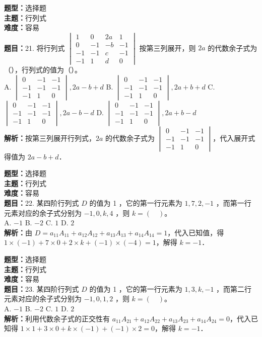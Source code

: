 \documentclass{ctexart}
\newenvironment{question}[5]{%
	\noindent\textbf{题型：}#1\\
	\textbf{主题：}#2\\
	\textbf{难度：}#3\\
	\textbf{题目：}#4\\
	\textbf{解析：}#5\\
	\vspace{1em}
}{}
\begin{document}
	\begin{question}
		{选择题}
		{行列式}
		{容易}
		{21. 将行列式 $\begin{vmatrix}1 & 0 & 2a & 1 \\ 0 & -1 & -b & -1 \\ -1 & -1 & c & -1 \\ -1 & 1 & d & 0\end{vmatrix}$ 按第三列展开，则 $2a$ 的代数余子式为（），行列式的值为（）。\\
			A. $\begin{vmatrix}0 & -1 & -1 \\ -1 & -1 & -1 \\ -1 & 1 & 0\end{vmatrix}, 2a-b+d$ \quad
			B. $\begin{vmatrix}0 & -1 & -1 \\ -1 & -1 & -1 \\ -1 & 1 & 0\end{vmatrix}, 2a+b+d$ \quad
			C. $\begin{vmatrix}0 & -1 & -1 \\ -1 & -1 & -1 \\ -1 & 1 & 0\end{vmatrix}, 2a-b-d$ \quad
			D. $\begin{vmatrix}0 & -1 & -1 \\ -1 & -1 & -1 \\ -1 & 1 & 0\end{vmatrix}, 2a+b-d$}
		{按第三列展开行列式，$2a$ 的代数余子式为 $\begin{vmatrix}0 & -1 & -1 \\ -1 & -1 & -1 \\ -1 & 1 & 0\end{vmatrix}$，代入展开式得值为 $2a-b+d$．}
	\end{question}
	
	
	\begin{question}
		{选择题}
		{行列式}
		{容易}
		{22. 某四阶行列式 $D$ 的值为 1 ，它的第一行元素为 $1,7,2,-1$ ，而第一行元素对应的余子式分别为 $-1,0,k,4$ ，则 $k=(\quad)$。\\
			A. $-1$ \quad B. $-2$ \quad C. $1$ \quad D. $2$}
		{由 $D = a_{11}A_{11} + a_{12}A_{12} + a_{13}A_{13} + a_{14}A_{14} = 1$，代入已知值，得 $1 \times (-1) + 7 \times 0 + 2 \times k + (-1) \times (-4) = 1$，解得 $k = -1$．}
	\end{question}
	
	
	\begin{question}
		{选择题}
		{行列式}
		{容易}
		{23. 某四阶行列式 $D$ 的值为 1 ，它的第一行元素为 $1,3,k,-1$ ，而第二行元素对应的余子式分别为 $-1,0,1,2$ ，则 $k=(\quad)$。\\
			A. $-1$ \quad B. $-2$ \quad C. $1$ \quad D. $2$}
		{利用代数余子式的正交性有 $a_{11}A_{21} + a_{12}A_{22} + a_{13}A_{23} + a_{14}A_{24} = 0$，代入已知得 $1\times1 + 3\times0 + k\times(-1) + (-1)\times2 = 0$，解得 $k = -1$．}
	\end{question}
	
\end{document}
